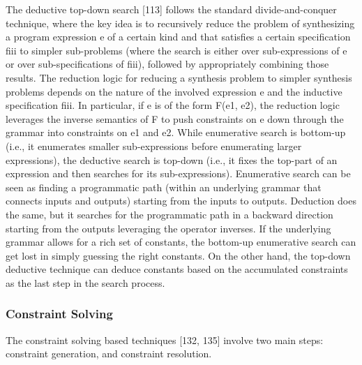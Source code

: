 The deductive top-down search [113] follows the standard
divide-and-conquer technique, where the key idea is to recursively reduce
the problem of synthesizing a program expression e of a certain kind and
that satisfies a certain specification fiii to simpler sub-problems (where
the search is either over sub-expressions of e or over sub-specifications
of fiii), followed by appropriately combining those results. The reduction
logic for reducing a synthesis problem to simpler synthesis problems
depends on the nature of the involved expression e and the inductive
specification fiii. In particular, if e is of the form F(e1, e2), the reduction
logic leverages the inverse semantics of F to push constraints on e down
through the grammar into constraints on e1 and e2.
While enumerative search is bottom-up (i.e., it enumerates smaller
sub-expressions before enumerating larger expressions), the deductive
search is top-down (i.e., it fixes the top-part of an expression and
then searches for its sub-expressions). Enumerative search can be seen
as finding a programmatic path (within an underlying grammar that
connects inputs and outputs) starting from the inputs to outputs.
Deduction does the same, but it searches for the programmatic path in
a backward direction starting from the outputs leveraging the operator
inverses. If the underlying grammar allows for a rich set of constants,
the bottom-up enumerative search can get lost in simply guessing the
right constants. On the other hand, the top-down deductive technique
can deduce constants based on the accumulated constraints as the last
step in the search process.


\subsubsection{Constraint Solving}
\label{subsubsec:ConstraintSolving}

The constraint solving based techniques [132, 135]
involve two main steps: constraint generation, and constraint resolution.

